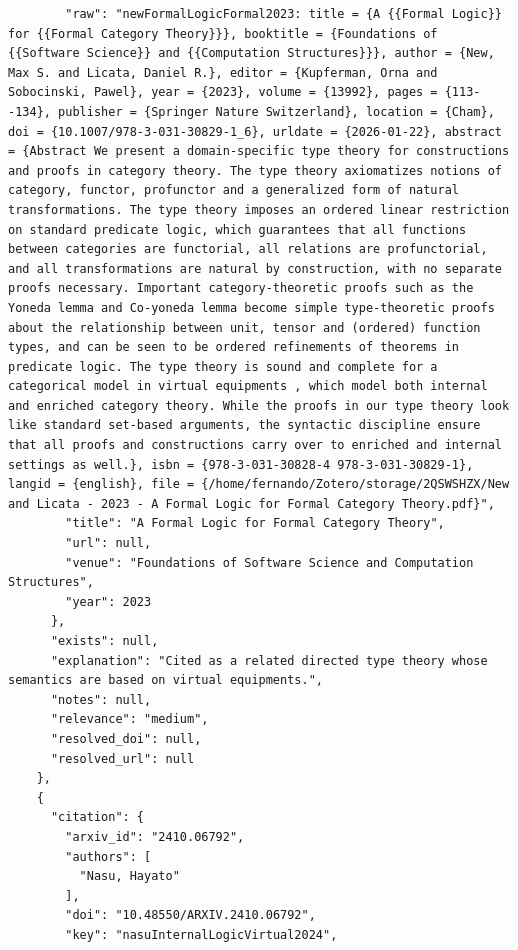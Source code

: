 \documentclass[11pt]{article}
\begin{document}
\begin{verbatim}
        "raw": "newFormalLogicFormal2023: title = {A {{Formal Logic}} for {{Formal Category Theory}}}, booktitle = {Foundations of {{Software Science}} and {{Computation Structures}}}, author = {New, Max S. and Licata, Daniel R.}, editor = {Kupferman, Orna and Sobocinski, Pawel}, year = {2023}, volume = {13992}, pages = {113--134}, publisher = {Springer Nature Switzerland}, location = {Cham}, doi = {10.1007/978-3-031-30829-1_6}, urldate = {2026-01-22}, abstract = {Abstract We present a domain-specific type theory for constructions and proofs in category theory. The type theory axiomatizes notions of category, functor, profunctor and a generalized form of natural transformations. The type theory imposes an ordered linear restriction on standard predicate logic, which guarantees that all functions between categories are functorial, all relations are profunctorial, and all transformations are natural by construction, with no separate proofs necessary. Important category-theoretic proofs such as the Yoneda lemma and Co-yoneda lemma become simple type-theoretic proofs about the relationship between unit, tensor and (ordered) function types, and can be seen to be ordered refinements of theorems in predicate logic. The type theory is sound and complete for a categorical model in virtual equipments , which model both internal and enriched category theory. While the proofs in our type theory look like standard set-based arguments, the syntactic discipline ensure that all proofs and constructions carry over to enriched and internal settings as well.}, isbn = {978-3-031-30828-4 978-3-031-30829-1}, langid = {english}, file = {/home/fernando/Zotero/storage/2QSWSHZX/New and Licata - 2023 - A Formal Logic for Formal Category Theory.pdf}",
        "title": "A Formal Logic for Formal Category Theory",
        "url": null,
        "venue": "Foundations of Software Science and Computation Structures",
        "year": 2023
      },
      "exists": null,
      "explanation": "Cited as a related directed type theory whose semantics are based on virtual equipments.",
      "notes": null,
      "relevance": "medium",
      "resolved_doi": null,
      "resolved_url": null
    },
    {
      "citation": {
        "arxiv_id": "2410.06792",
        "authors": [
          "Nasu, Hayato"
        ],
        "doi": "10.48550/ARXIV.2410.06792",
        "key": "nasuInternalLogicVirtual2024",

\end{verbatim}
\end{document}
